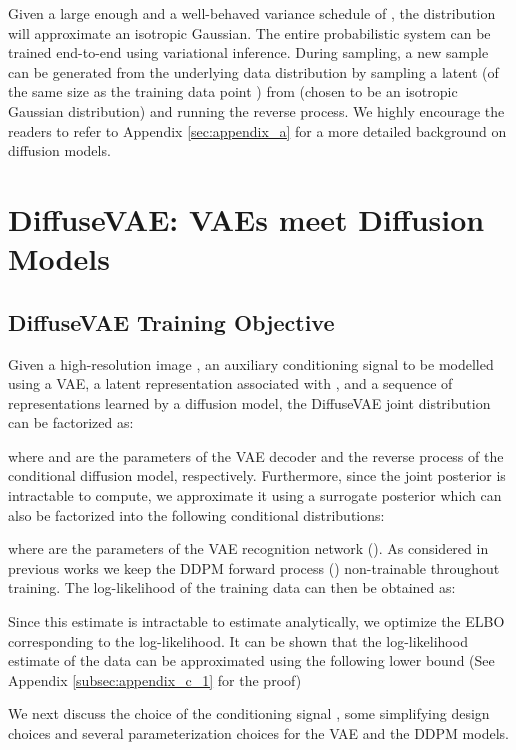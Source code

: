 \documentclass[10pt]{article} \usepackage[accepted]{tmlr}
\begin{document}
Given a large enough  and a well-behaved variance schedule of , the distribution  will approximate an isotropic Gaussian. The entire probabilistic system can be trained end-to-end using variational inference. During sampling, a new sample can be generated from the underlying data distribution by sampling a latent (of the same size as the training data point ) from  (chosen to be an isotropic Gaussian distribution) and running the reverse process. We highly encourage the readers to refer to Appendix \ref{sec:appendix_a} for a more detailed background on diffusion models.





\section{DiffuseVAE: VAEs meet Diffusion Models}
\label{sec:DiffuseVAE}

\subsection{DiffuseVAE Training Objective}
\label{subsec:DiffuseVAE_training_objective}

Given a high-resolution image , an auxiliary conditioning signal  to be modelled using a VAE, a latent representation  associated with , and a sequence of  representations  learned by a diffusion model, the DiffuseVAE joint distribution can be factorized as:

where  and  are the parameters of the VAE decoder and the reverse process of the conditional diffusion model, respectively.
Furthermore, since the joint posterior  is intractable to compute, we approximate it using a surrogate posterior  which can also be factorized into the following conditional distributions:

where  are the parameters of the VAE recognition network (). As considered in previous works \citep{sohldickstein2015deep, ho2020denoising} we keep the DDPM forward process () non-trainable throughout training. The log-likelihood of the training data can then be obtained as:

Since this estimate is intractable to estimate analytically, we optimize the ELBO corresponding to the log-likelihood. It can be shown that the log-likelihood estimate of the data can be approximated using the following lower bound (See Appendix \ref{subsec:appendix_c_1} for the proof)

We next discuss the choice of the conditioning signal , some simplifying design choices and several parameterization choices for the VAE and the DDPM models.
\end{document}
